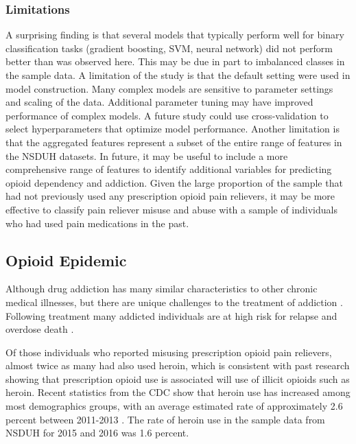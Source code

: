 \documentclass[sigconf]{acmart}
\begin{document}

\subsubsection{Limitations}

A surprising finding is that several models that typically perform well for 
binary classification tasks (gradient boosting, SVM, neural network) did not 
perform better than was observed here. This may be due in part to imbalanced 
classes in the sample data. A limitation of the study is that the default 
setting were used in model construction. Many complex models are sensitive 
to parameter settings and scaling of the data. Additional parameter tuning 
may have improved performance of complex models. A future study could use 
cross-validation to select hyperparameters that optimize model performance.
Another limitation is that the aggregated features represent a subset
of the entire range of features in the NSDUH datasets. In future, it may
be useful to include a more comprehensive range of features to identify 
additional variables for predicting opioid dependency and addiction. 
Given the large proportion of the sample that had not previously used any
prescription opioid pain relievers, it may be more effective to classify 
pain reliever misuse and abuse with a sample of individuals who had used 
pain medications in the past.


\subsection{Opioid Epidemic}

Although drug addiction has many similar characteristics 
to other chronic medical illnesses, but there are unique challenges to the 
treatment of addiction \cite{marsch12, swendson16}. 
Following treatment many addicted individuals are at high 
risk for relapse and overdose death \cite{shaham03}.

Of those individuals who reported misusing prescription opioid pain relievers, 
almost twice as many had also used heroin, which is  consistent with past
research showing that prescription opioid use is associated will use of illicit 
opioids such as heroin. Recent statistics from the CDC show that heroin use has 
increased among most demographics groups, with an average estimated rate  of 
approximately 2.6 percent between 2011-2013 \cite{cdc16}. The rate of heroin use
in the sample data from NSDUH for 2015 and 2016 was 1.6 percent. 
\end{document}
